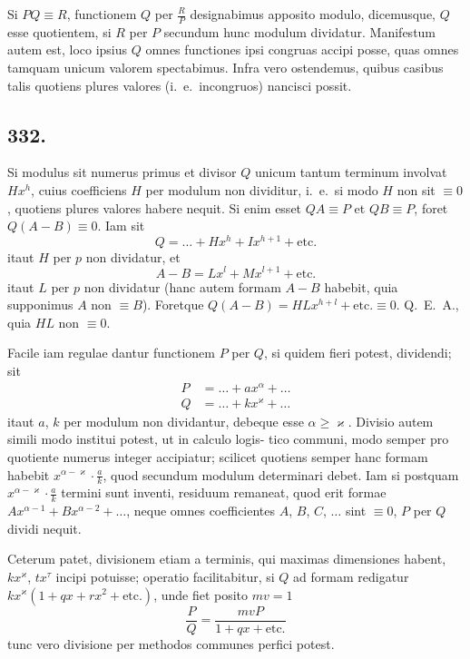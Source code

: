 \documentclass[12pt]{article}
\begin{document}
Si $PQ\equiv R$, functionem $Q$ per $\frac{R}{P}$ designabimus apposito modulo, dicemusque, $Q$ esse quotientem, si $R$ per $P$ secundum hunc modulum dividatur. Manifestum autem est, loco ipsius $Q$ omnes functiones ipsi congruas accipi posse, quas omnes tamquam unicum valorem spectabimus. Infra vero ostendemus, quibus casibus talis quotiens plures valores (i.~e.~incongruos) nancisci possit.

\subsection*{332.}

Si modulus sit numerus primus et divisor $Q$ unicum tantum terminum involvat $Hx^h$, cuius coefficiens $H$ per modulum non dividitur, i.~e.~si modo $H$ non sit $\equiv 0$, quotiens plures valores habere nequit. Si enim esset $QA\equiv P$ et $QB\equiv P$, foret $Q(A-B)\equiv 0$. Iam sit
\[
Q = \ldots + Hx^h + Ix^{h+1} + \text{etc.}
\]
itaut $H$ per $p$ non dividatur, et
\[
A-B = Lx^l + Mx^{l+1} + \text{etc.}
\]
itaut $L$ per $p$ non dividatur (hanc autem formam $A-B$ habebit, quia supponimus $A$ non $\equiv B$). Foretque $Q(A-B) = HLx^{h+l} + \text{etc.} \equiv 0$. Q.~E.~A., quia $HL$ non $\equiv 0$.

Facile iam regulae dantur functionem $P$ per $Q$, si quidem fieri potest, dividendi; sit
\[
\begin{aligned}
P &= \ldots + ax^\alpha + \ldots\\
Q &= \ldots + kx^\varkappa + \ldots
\end{aligned}
\]
itaut $a$, $k$ per modulum non dividantur, debeque esse $\alpha\geq\varkappa$. Divisio autem simili modo institui potest, ut in calculo logis- tico communi, modo semper pro quotiente numerus integer accipiatur; scilicet quotiens semper hanc formam habebit $x^{\alpha-\varkappa}\cdot\frac{a}{k}$, quod secundum modulum determinari debet. Iam si postquam $x^{\alpha-\varkappa}\cdot\frac{a}{k}$ termini sunt inventi, residuum remaneat, quod erit formae $Ax^{\alpha-1}+Bx^{\alpha-2}+\ldots$, neque omnes coefficientes $A$, $B$, $C$, $\ldots$ sint $\equiv 0$, $P$ per $Q$ dividi nequit.

Ceterum patet, divisionem etiam a terminis, qui maximas dimensiones habent, $kx^\varkappa$, $tx^\tau$ incipi potuisse; operatio facilitabitur, si $Q$ ad formam redigatur $kx^\varkappa(1+qx+rx^2+\text{etc.})$, unde fiet posito $mv=1$
\[
\frac{P}{Q} = \frac{mvP}{1+qx+\text{etc.}}
\]
tunc vero divisione per methodos communes perfici potest.
\end{document}
